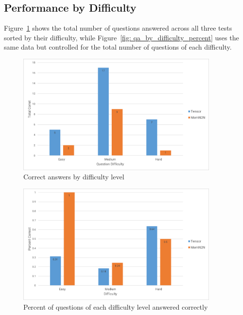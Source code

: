 \documentclass[pageno]{final_paper}
\begin{document}
\subsection{Performance by Difficulty}
\label{Performance by Difficulty}

Figure~\ref{fig: qa_by_difficulty} shows the total number of questions answered
across all three tests sorted by their difficulty, while Figure~\ref{fig:
qa_by_difficulty_percent} uses the same data but controlled for the total number
of questions of each difficulty.

\begin{figure}[!tb]
    \centering
    \includegraphics[width=0.9\textwidth,keepaspectratio]{figures/qa_by_difficulty.png}
    \caption{Correct answers by difficulty level}
    \label{fig: qa_by_difficulty}
\end{figure}

\begin{figure}[!bt]
    \centering
    \includegraphics[width=0.9\textwidth,keepaspectratio]{figures/qa_by_difficulty_percent.png}
    \caption{Percent of questions of each difficulty level answered correctly}
    \label{fig: qa_by_difficulty_percent}
\end{figure}
\end{document}
